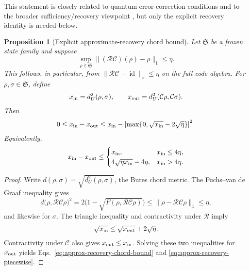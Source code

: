 \documentclass[11pt]{article}
\newtheorem{proposition}{Proposition}
\newcommand{\id}{\operatorname{id}}
\begin{document}
This statement is closely related to quantum error-correction conditions
\cite{KnillLaflamme1997} and to the broader sufficiency/recovery viewpoint
\cite{Petz1986}, but only the explicit recovery identity is needed below.

\begin{proposition}[Explicit approximate-recovery chord bound]
Let \(\mathfrak S\) be a frozen state family and suppose
\begin{equation}
 \sup_{\rho\in\mathfrak S}
 \lVert(\mathcal R\mathcal C)(\rho)-\rho\rVert_1\leq\eta.
 \label{eq:state-family-recovery-error}
\end{equation}
This follows, in particular, from
\(\lVert\mathcal R\mathcal C-\id\rVert_\diamond\leq\eta\) on the full code
algebra.  For \(\rho,\sigma\in\mathfrak S\), define
\begin{equation}
 x_{\rm in}=d_U^2(\rho,\sigma),\qquad
 x_{\rm out}=d_U^2(\mathcal C\rho,\mathcal C\sigma).
\end{equation}
Then
\begin{equation}
 0\leq x_{\rm in}-x_{\rm out}
 \leq x_{\rm in}-
 \left[\max\{0,\sqrt{x_{\rm in}}-2\sqrt\eta\}\right]^2.
 \label{eq:approx-recovery-chord-bound}
\end{equation}
Equivalently,
\begin{equation}
 x_{\rm in}-x_{\rm out}
 \leq
 \begin{cases}
 x_{\rm in},&x_{\rm in}\leq4\eta,\\
 4\sqrt{\eta x_{\rm in}}-4\eta,&x_{\rm in}>4\eta.
 \end{cases}
 \label{eq:approx-recovery-piecewise}
\end{equation}
\end{proposition}
\begin{proof}
Write \(d(\rho,\sigma)=\sqrt{d_U^2(\rho,\sigma)}\), the Bures chord metric.
The Fuchs--van de Graaf inequality \cite{FuchsVandeGraaf1999} gives
\begin{equation}
 d\bigl(\rho,\mathcal R\mathcal C\rho\bigr)^2
 =2\bigl(1-\sqrt{F(\rho,\mathcal R\mathcal C\rho)}\bigr)
 \leq\lVert\rho-\mathcal R\mathcal C\rho\rVert_1\leq\eta,
\end{equation}
and likewise for \(\sigma\).  The triangle inequality and contractivity under
\(\mathcal R\) imply
\begin{equation}
 \sqrt{x_{\rm in}}
 \leq\sqrt{x_{\rm out}}+2\sqrt\eta.
\end{equation}
Contractivity under \(\mathcal C\) also gives
\(x_{\rm out}\leq x_{\rm in}\).  Solving these two inequalities for
\(x_{\rm out}\) yields Eqs.~\eqref{eq:approx-recovery-chord-bound} and
\eqref{eq:approx-recovery-piecewise}.
\end{proof}
\end{document}
